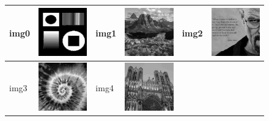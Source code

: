\documentclass{article}
\begin{document}
\begin{figure}
\begin{center}
\begin{tabular}[t]{|ll|ll|ll|}
\hline
img0 & \includegraphics[width=4cm]{../imgs/output/gray_8_50_2000/img00.png} &
img1 & \includegraphics[width=4cm]{../imgs/output/gray_8_50_2000/img01.png} &
img2 & \includegraphics[width=4cm]{../imgs/output/gray_8_50_2000/img02.png} \\
\hline
img3 & \includegraphics[width=4cm]{../imgs/output/gray_8_50_2000/img03.png} &
img4 & \includegraphics[width=4cm]{../imgs/output/gray_8_50_2000/img04.png} &

\end{tabular}
\end{center}
\end{figure}
\end{document}
